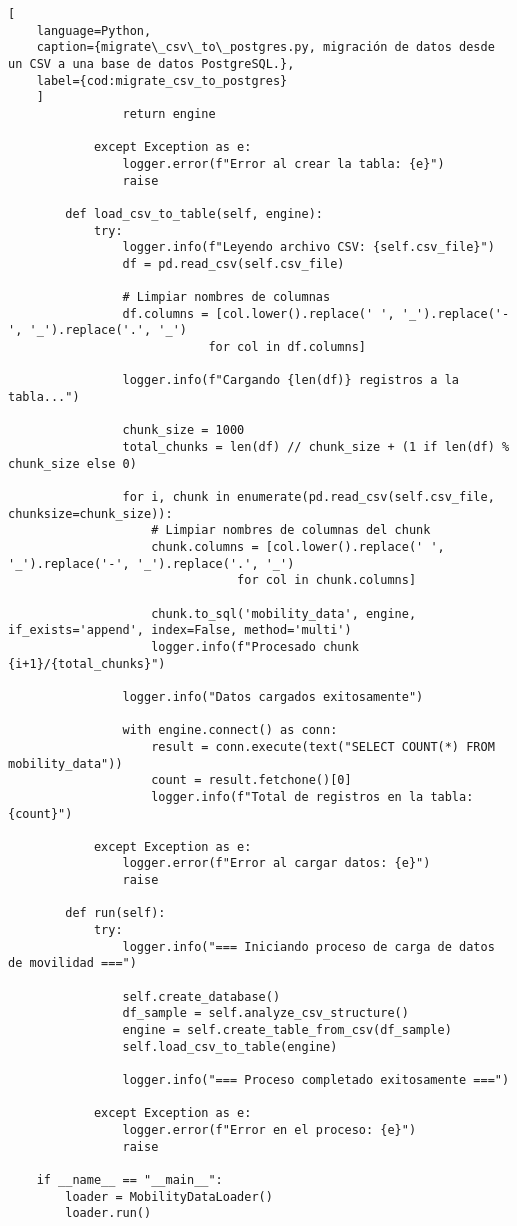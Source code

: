 \begin{lstlisting}[
    language=Python,
    caption={migrate\_csv\_to\_postgres.py, migración de datos desde un CSV a una base de datos PostgreSQL.},
    label={cod:migrate_csv_to_postgres}
    ]
                return engine
                
            except Exception as e:
                logger.error(f"Error al crear la tabla: {e}")
                raise
        
        def load_csv_to_table(self, engine):
            try:
                logger.info(f"Leyendo archivo CSV: {self.csv_file}")
                df = pd.read_csv(self.csv_file)
                
                # Limpiar nombres de columnas
                df.columns = [col.lower().replace(' ', '_').replace('-', '_').replace('.', '_') 
                            for col in df.columns]
                
                logger.info(f"Cargando {len(df)} registros a la tabla...")
                
                chunk_size = 1000
                total_chunks = len(df) // chunk_size + (1 if len(df) % chunk_size else 0)
                
                for i, chunk in enumerate(pd.read_csv(self.csv_file, chunksize=chunk_size)):
                    # Limpiar nombres de columnas del chunk
                    chunk.columns = [col.lower().replace(' ', '_').replace('-', '_').replace('.', '_') 
                                for col in chunk.columns]
                    
                    chunk.to_sql('mobility_data', engine, if_exists='append', index=False, method='multi')
                    logger.info(f"Procesado chunk {i+1}/{total_chunks}")
                
                logger.info("Datos cargados exitosamente")
                
                with engine.connect() as conn:
                    result = conn.execute(text("SELECT COUNT(*) FROM mobility_data"))
                    count = result.fetchone()[0]
                    logger.info(f"Total de registros en la tabla: {count}")
                    
            except Exception as e:
                logger.error(f"Error al cargar datos: {e}")
                raise
        
        def run(self):
            try:
                logger.info("=== Iniciando proceso de carga de datos de movilidad ===")
                
                self.create_database()
                df_sample = self.analyze_csv_structure()
                engine = self.create_table_from_csv(df_sample)
                self.load_csv_to_table(engine)
                
                logger.info("=== Proceso completado exitosamente ===")
                
            except Exception as e:
                logger.error(f"Error en el proceso: {e}")
                raise

    if __name__ == "__main__":
        loader = MobilityDataLoader()
        loader.run()
\end{lstlisting}
\vfill

